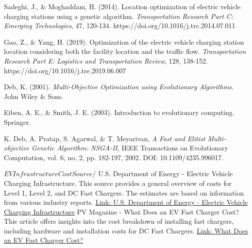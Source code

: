 \begin{thebibliography}{99}
     Sadeghi, J., \& Moghaddam, H. (2014). Location optimization of electric vehicle charging stations using a genetic algorithm. \textit{Transportation Research Part C: Emerging Technologies}, 47, 120-134. https://doi.org/10.1016/j.trc.2014.07.011

    
     Gao, Z., \& Yang, H. (2019). Optimization of the electric vehicle charging station location considering both the facility location and the traffic flow. \textit{Transportation Research Part E: Logistics and Transportation Review}, 128, 138-152. https://doi.org/10.1016/j.tre.2019.06.007


    

    Deb, K. (2001). \textit{Multi-Objective Optimization using Evolutionary Algorithms}. John Wiley \& Sons.

     Eiben, A. E., \& Smith, J. E. (2003). Introduction to evolutionary computing. Springer.

     K. Deb, A. Pratap, S. Agarwal, \& T. Meyarivan, \textit{A Fast and Elitist Multi-objective Genetic Algorithm: NSGA-II}, IEEE Transactions on Evolutionary Computation, vol. 6, no. 2, pp. 182-197, 2002. DOI: 10.1109/4235.996017.


    

    $
    EV Infrastructure Cost Source 
    /$
     U.S. Department of Energy - Electric Vehicle Charging Infrastructure. This source provides a general overview of costs for Level 1, Level 2, and DC Fast Chargers. The estimates are based on information from various industry reports. \href{https://www.energy.gov/eere/vehicles/ev-charging-infrastructure}{Link: U.S. Department of Energy - Electric Vehicle Charging Infrastructure}
     PV Magazine - What Does an EV Fast Charger Cost? This article offers insights into the cost breakdown of installing fast chargers, including hardware and installation costs for DC Fast Chargers. \href{https://www.pv-magazine.com/2021/10/18/what-does-an-ev-fast-charger-cost/}{Link: What Does an EV Fast Charger Cost?}


\end{thebibliography}
